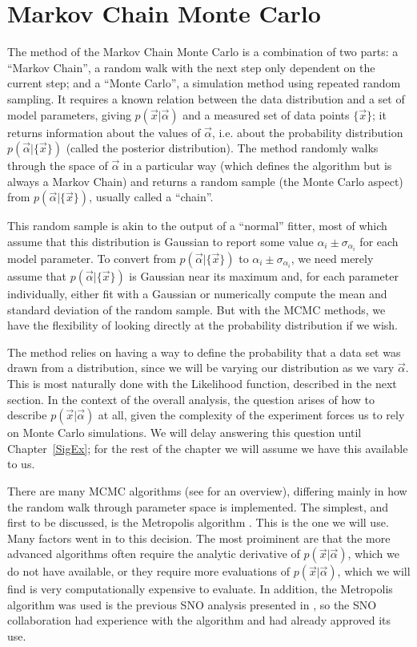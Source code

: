 \section{Markov Chain Monte Carlo}
The method of the Markov Chain Monte Carlo is a combination of two
parts: a ``Markov Chain'', a random walk with the next step only
dependent on the current step; and a ``Monte Carlo'', a simulation
method using repeated random sampling.  It requires a known relation
between the data distribution and a set of model parameters, giving
$p(\vec{x}|\vec{\alpha})$ and a measured set of data points
$\{\vec{x}\}$; it returns information about the values of
$\vec{\alpha}$, i.e. about the probability distribution
$p(\vec{\alpha}|\{\vec{x}\})$ (called the posterior distribution).
The method randomly walks through the space of $\vec{\alpha}$ in a
particular way (which defines the algorithm but is always a Markov
Chain) and returns a random sample (the Monte Carlo aspect) from
$p(\vec{\alpha}|\{\vec{x}\})$, usually called a ``chain''.

This random sample is akin to the output of a ``normal'' fitter, most
of which assume that this distribution is Gaussian to report some
value $\alpha_i \pm \sigma_{\alpha_i}$ for each model parameter.  To
convert from $p(\vec{\alpha}|\{\vec{x}\})$ to $\alpha_i \pm
\sigma_{\alpha_i}$, we need merely assume that
$p(\vec{\alpha}|\{\vec{x}\})$ is Gaussian near its maximum and, for
each parameter individually, either fit with a Gaussian or numerically
compute the mean and standard deviation of the random sample.  But
with the MCMC methods, we have the flexibility of looking directly at
the probability distribution if we wish.  

The method relies on having a way to define the probability that a
data set was drawn from a distribution, since we will be varying our
distribution as we vary $\vec{\alpha}$.  This is most naturally done
with the Likelihood function, described in the next section.  In the
context of the overall analysis, the question arises of how to
describe $p(\vec{x}|\vec{\alpha})$ at all, given the complexity of the
experiment forces us to rely on Monte Carlo simulations.  We will
delay answering this question until \mbox{Chapter \ref{SigEx}}; for
the rest of the chapter we will assume we have this available to us.

There are many MCMC algorithms (see \cite{ref:DataAnalysisBook,
NealReport} for an overview), differing mainly in how the random walk
through parameter space is implemented.  The simplest, and first to be
discussed, is the Metropolis algorithm \cite{MetropolisPaper}.  This
is the one we will use.  Many factors went in to this decision. The
most proiminent are that the more advanced algorithms often require
the analytic derivative of $p(\vec{x}|\vec{\alpha})$, which we do not
have available, or they require more evaluations of
$p(\vec{x}|\vec{\alpha})$, which we will find is very computationally
expensive to evaluate.  In addition, the Metropolis algorithm was used
is the previous SNO analysis presented in \cite{NCDPRL}, so the SNO
collaboration had experience with the algorithm and had already
approved its use.

